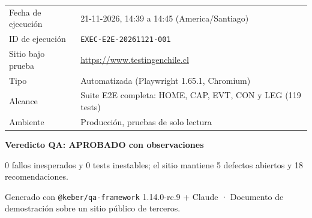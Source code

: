 \documentclass[11pt,a4paper]{article}
\newcommand{\code}[1]{\texttt{#1}}
\begin{document}
\begin{titlepage}
\thispagestyle{empty}

\vspace*{7.4cm}

{\large
\begin{tabularx}{\textwidth}{@{}p{} X@{}}
\textcolor{muted}{Fecha de ejecución} & 21-11-2026, 14:39 a 14:45 (America/Santiago) \\
\textcolor{muted}{ID de ejecución} & \code{EXEC-E2E-20261121-001} \\
\textcolor{muted}{Sitio bajo prueba} & \url{https://www.testingenchile.cl} \\
\textcolor{muted}{Tipo} & Automatizada (Playwright 1.65.1, Chromium) \\
\textcolor{muted}{Alcance} & Suite E2E completa: HOME, CAP, EVT, CON y LEG (119 tests) \\
\textcolor{muted}{Ambiente} & Producción, pruebas de solo lectura \\
\end{tabularx}}

\vfill

\begin{tcolorbox}[colback=secondary!7, colframe=secondary, boxrule=0pt, leftrule=3pt, arc=2pt]
{\large\bfseries\color{secondary}Veredicto QA: APROBADO con observaciones}\par
\small 0 fallos inesperados y 0 tests inestables; el sitio mantiene 5 defectos abiertos y 18 recomendaciones.
\end{tcolorbox}

\vspace{1.2cm}
{\small\color{muted}Generado con \code{@keber/qa-framework} 1.14.0-rc.9 + Claude · Documento de demostración sobre un sitio público de terceros.}
\end{titlepage}
\setcounter{page}{2}
\end{document}
